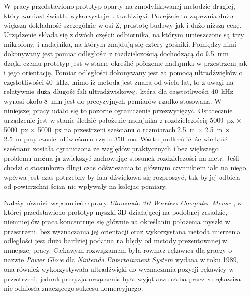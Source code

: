  W pracy przedstawiono prototyp oparty na zmodyfikowanej metodzie drugiej, który zamiast światła wykorzystuje ultradźwięki. 
 Podejście to zapewnia dużo większą dokładność szczególnie w osi Z, prostotę budowy jak i dużo niższą cenę.
 Urządzenie składa się z dwóch części: odbiornika, na którym umieszczone są trzy mikrofony, i nadajnika,
 na którym znajdują się cztery głośniki. Pomiędzy nimi dokonywany jest pomiar odległości z rozdzielczością
 dochodzącą do \SI{0,5}{mm} dzięki czemu prototyp jest w stanie określić położenie nadajnika
w przestrzeni jak i jego orientację. 
Pomiar odległości dokonywany jest za pomocą ultradźwięków o częstotliwości \SI{40}{kHz},
mimo iż metoda jest znana od wielu lat, to z uwagi na relatywnie dużą długość fali ultradźwiękowej,
która dla częstotliwości \SI{40}{kHz} wynosi około \SI{8}{mm} jest do precyzyjnych pomiarów rzadko stosowana.
W niniejszej pracy udało się to pozorne ograniczenie przezwyciężyć.
Ostatecznie urządzenie jest w stanie śledzić położenie nadajnika z rozdzielczością 
\SI{5000}{px} $\times$ \SI{5000}{px} $\times$ \SI{5000}{px} na przestrzeni sześcianu o rozmiarach 
\SI{2,5}{m} $\times$ \SI{2,5}{m}  $\times$ \SI{2,5}{m} przy czasie odświeżania rzędu \SI{350}{ms}.
Warto podkreślić, że wielkość sześcianu została ograniczona ze względów praktycznych i bez 
większego problemu można ją zwiększyć zachowując stosunek rozdzielczości na metr.
Jeśli chodzi o stosunkowo długi czas odświeżania to
 głównym czynnikiem jaki na niego wpływa jest czas potrzebny by fala dźwiękowa się rozproszyć,
 tak by jej odbicia od powierzchni ścian nie wpływały na kolejne pomiary.

Należy również wspomnieć o pracy \textit{Ultrasonic 3D Wireless Computer Mouse} \cite{bib:mouse}, w której przedstawiono 
prototyp myszki 3D działającej na podobnej zasadzie, niemniej ów praca koncentruje się głównie
na określaniu położenia myszki w przestrzeni, bez wyznaczania jej orientacji oraz wykorzystana metoda 
mierzenia odległości jest dużo bardziej podatna na błędy od metody prezentowanej w niniejszej pracy.
Ciekawym rozwiązaniem była również rękawica dla graczy o nazwie \textit{Power Glove} \cite{bib:powerGlove} \cite{bib:powerGlove2} dla
\textit{Nintendo Entertainment System} wydana w roku 1989, ona również wykorzystywała ultradźwięki do wyznaczania pozycji
rękawicy w przestrzeni, jednak precyzja urządzenia była wyjątkowo słaba przez co rękawica nie odniosła znaczącego sukcesu komercyjnego.


